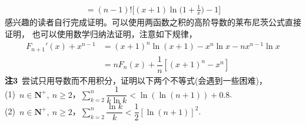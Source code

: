 \begin{enumerate}[label={【\textbf{例\thechapter.\arabic*}】},
 leftmargin=\inteval{\myenumleftmargin}pt,
 itemsep=\inteval{\myenumitempsep}pt,
 itemindent=\inteval{\myenumitemindent}pt]
\begin{gather*}
    =(n-1)!\Big[(x+1)\ln\Big(1+\frac{1}{x}\Big)-1\Big]
\end{gather*}
感兴趣的读者自行完成证明。可以使用两函数之积的高阶导数的莱布尼茨公式直接证明，
也可以使用数学归纳法证明，注意如下规律，
\begin{align*}
    F_{n+1}'(x)+x^{n-1} & =(x+1)^n\ln(x+1)-x^n\ln x-nx^{n-1}\ln x\\
    & =nF_n(x)+\dfrac{1}{n}[(x+1)^n-x^n]
\end{align*}
\textbf{注3}\ 尝试只用导数而不用积分，证明以下两个不等式(会遇到一些困难)，\\
(1)\ $ n\in \textbf{N}^+,\ n\geq 2 $，$ \sum\limits_{k=2}^{n}
\dfrac{1}{k\ln k}<\ln(\ln (n+1))+0.8 $.\\ 
(2)\ $ n\in \textbf{N}^+,\ n\geq 2 $，$ \sum\limits_{k=2}^{n}
\dfrac{\ln k}{k}<\dfrac{1}{2}[\ln(n+1)]^2 $.\\ 


\end{enumerate}

